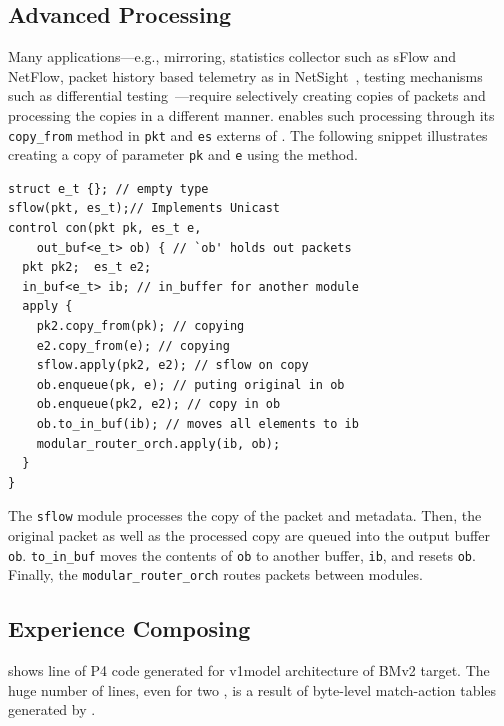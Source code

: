 \documentclass[letterpaper,twocolumn,10pt]{article}
\begin{document}
\subsection{Advanced Processing}
Many applications---e.g., mirroring, statistics collector such as
sFlow and NetFlow, packet history based telemetry as in
NetSight~\cite{179783}, testing mechanisms such as differential
testing~\cite{Zheng:2018:PLV:3281411.3281436}---require selectively
creating copies of packets and processing the copies in a different
manner. \ulang enables such processing through its \texttt{copy\_from}
method in \texttt{pkt} and \texttt{es} externs of \uarch. The
following snippet illustrates creating a copy of parameter \texttt{pk}
and \texttt{e} using the method.
\begin{lstlisting}[frame=none]
struct e_t {}; // empty type
sflow(pkt, es_t);// Implements Unicast 
control con(pkt pk, es_t e, 
    out_buf<e_t> ob) { // `ob' holds out packets
  pkt pk2;  es_t e2;
  in_buf<e_t> ib; // in_buffer for another module
  apply {
    pk2.copy_from(pk); // copying
    e2.copy_from(e); // copying
    sflow.apply(pk2, e2); // sflow on copy
    ob.enqueue(pk, e); // puting original in ob
    ob.enqueue(pk2, e2); // copy in ob
    ob.to_in_buf(ib); // moves all elements to ib
    modular_router_orch.apply(ib, ob);
  }
}
\end{lstlisting}
The \texttt{sflow} module processes the copy of the packet and
metadata.  Then, the original packet as well as the processed copy are
queued into the output buffer \texttt{ob}. \texttt{to\_in\_buf} moves
the contents of \texttt{ob} to another buffer, \texttt{ib}, and resets
\texttt{ob}. Finally, the \texttt{modular\_router\_orch} routes
packets between modules.

\subsection{Experience Composing \uprograms}
 shows line of P4 code generated for 
v1model \cite{v1model.p4} architecture of BMv2 target. The huge 
number of lines, even for two \uprograms, is a result of 
byte-level match-action tables generated by \ucomp.
\end{document}
